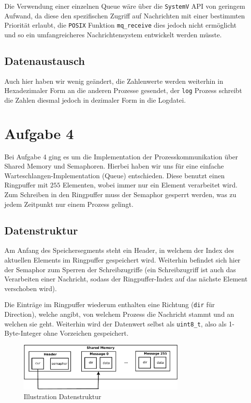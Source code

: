 \documentclass[12pt, a4paper]{scrartcl}
\begin{document}
Die Verwendung einer einzelnen Queue wäre über die \texttt{SystemV} API von geringem 
Aufwand, da diese den spezifischen Zugriff auf Nachrichten mit einer bestimmten 
Priorität erlaubt, die \texttt{POSIX} Funktion \texttt{mq\_receive} dies jedoch nicht 
ermöglicht und so ein umfangreicheres Nachrichtensystem entwickelt werden müsste.

\subsection{Datenaustausch}
Auch hier haben wir wenig geändert, die Zahlenwerte werden weiterhin in Hexadezimaler Form an die anderen Prozesse gesendet, der \texttt{log} Prozess schreibt die Zahlen diesmal jedoch in dezimaler Form in die Logdatei.

\clearpage
\section{Aufgabe 4}

Bei Aufgabe 4 ging es um die Implementation der Prozesskommunikation über
Shared Memory und Semaphoren. Hierbei haben wir uns für eine einfache
Warteschlangen-Implementation (Queue) entschieden. Diese benutzt einen
Ringpuffer mit $255$ Elementen, wobei immer nur ein Element verarbeitet
wird. Zum Schreiben in den Ringpuffer muss der Semaphor gesperrt werden, was zu
jedem Zeitpunkt nur einem Prozess gelingt.

\subsection{Datenstruktur}

Am Anfang des Speichersegments steht ein Header, in welchem der Index des
aktuellen Elements im Ringpuffer gespeichert wird. Weiterhin befindet sich hier
der Semaphor zum Sperren der Schreibzugriffe (ein Schreibzugriff ist auch das
Verarbeiten einer Nachricht, sodass der Ringpuffer-Index auf das nächste
Element verschoben wird).
\np

Die Einträge im Ringpuffer wiederum enthalten eine Richtung (\texttt{dir} für
Direction), welche angibt, von welchem Prozess die Nachricht stammt und an
welchen sie geht. Weiterhin wird der Datenwert selbst als \texttt{uint8\_t},
also als 1-Byte-Integer ohne Vorzeichen gespeichert.

\begin{figure}[h!]
\centering
\caption{Illustration Datenstruktur}
\includegraphics[width=0.75\textwidth]{a4-crop}
\end{figure}
\end{document}
